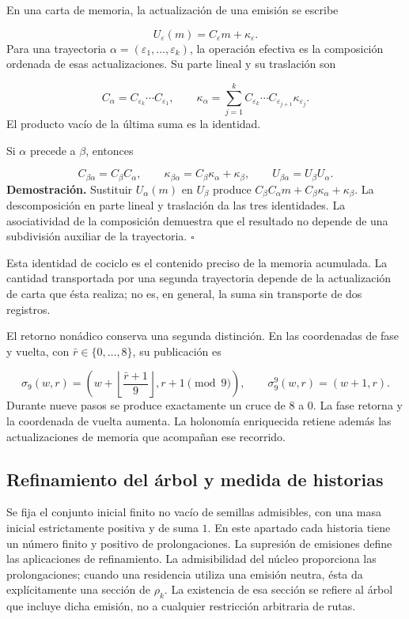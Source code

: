 En una carta de memoria, la actualización de una emisión se escribe

\[
U_\varepsilon(m)=C_\varepsilon m+\kappa_\varepsilon.
\]
Para una trayectoria \(\alpha=(\varepsilon_1,\ldots,\varepsilon_k)\), la operación efectiva es la composición ordenada de esas actualizaciones. Su parte lineal y su traslación son

\[
C_\alpha=C_{\varepsilon_k}\cdots C_{\varepsilon_1},
\qquad
\kappa_\alpha=
\sum_{j=1}^{k}C_{\varepsilon_k}\cdots
C_{\varepsilon_{j+1}}\kappa_{\varepsilon_j}.
\]
El producto vacío de la última suma es la identidad.

Si \(\alpha\) precede a \(\beta\), entonces

\[
C_{\beta\alpha}=C_\beta C_\alpha,
\qquad
\kappa_{\beta\alpha}=C_\beta\kappa_\alpha+\kappa_\beta,
\qquad
U_{\beta\alpha}=U_\beta U_\alpha.
\]
\textbf{Demostración.} Sustituir \(U_\alpha(m)\) en \(U_\beta\) produce \(C_\beta C_\alpha m+C_\beta\kappa_\alpha+\kappa_\beta\). La descomposición en parte lineal y traslación da las tres identidades. La asociatividad de la composición demuestra que el resultado no depende de una subdivisión auxiliar de la trayectoria. \hfill\(\square\)

Esta identidad de cociclo es el contenido preciso de la memoria acumulada. La cantidad transportada por una segunda trayectoria depende de la actualización de carta que ésta realiza; no es, en general, la suma sin transporte de dos registros.

El retorno nonádico conserva una segunda distinción. En las coordenadas de fase y vuelta, con \(\bar r\in\{0,\ldots,8\}\), su publicación es

\[
\sigma_9(w,r)=
\left(w+\left\lfloor\frac{\bar r+1}{9}\right\rfloor,
r+1\pmod9\right),
\qquad
\sigma_9^9(w,r)=(w+1,r).
\]
Durante nueve pasos se produce exactamente un cruce de \(8\) a \(0\). La fase retorna y la coordenada de vuelta aumenta. La holonomía enriquecida retiene además las actualizaciones de memoria que acompañan ese recorrido.

\subsection{Refinamiento del árbol y medida de historias}
Se fija el conjunto inicial finito no vacío de semillas admisibles, con una masa inicial estrictamente positiva y de suma \(1\). En este apartado cada historia tiene un número finito y positivo de prolongaciones. La supresión de emisiones define las aplicaciones de refinamiento. La admisibilidad del núcleo proporciona las prolongaciones; cuando una residencia utiliza una emisión neutra, ésta da explícitamente una sección de \(\rho_k\). La existencia de esa sección se refiere al árbol que incluye dicha emisión, no a cualquier restricción arbitraria de rutas.

